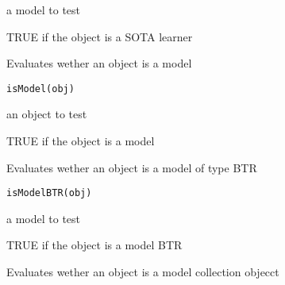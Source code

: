 \documentclass[a4paper]{book}
\begin{document}
%
\begin{Arguments}
\begin{ldescription}
\item[\code{obj:}] a model to test
\end{ldescription}
\end{Arguments}
%
\begin{Value}
TRUE if the object is a SOTA learner
\end{Value}
%
\begin{Description}
Evaluates wether an object is a model
\end{Description}
%
\begin{Usage}
\begin{verbatim}
isModel(obj)
\end{verbatim}
\end{Usage}
%
\begin{Arguments}
\begin{ldescription}
\item[\code{obj:}] an object to test
\end{ldescription}
\end{Arguments}
%
\begin{Value}
TRUE if the object is a model
\end{Value}
%
\begin{Description}
Evaluates wether an object is a model of type BTR
\end{Description}
%
\begin{Usage}
\begin{verbatim}
isModelBTR(obj)
\end{verbatim}
\end{Usage}
%
\begin{Arguments}
\begin{ldescription}
\item[\code{obj:}] a model to test
\end{ldescription}
\end{Arguments}
%
\begin{Value}
TRUE if the object is a model BTR
\end{Value}
%
\begin{Description}
Evaluates wether an object is a model collection objecct
\end{Description}
\end{document}
